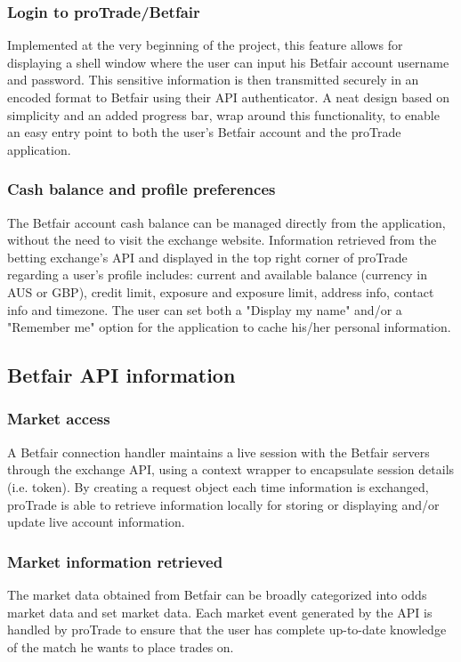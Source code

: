 \documentclass[10pt]{report}
\begin{document}
\subsubsection {Login to proTrade/Betfair}
Implemented at the very beginning of the project, this feature allows for displaying a shell window where the user can input his Betfair account username and password. This sensitive information is then transmitted securely in an encoded format to Betfair using their API authenticator. A neat design based on simplicity and an added progress bar, wrap around this functionality, to enable an easy entry point to both the user's Betfair account and the proTrade application.
\subsubsection {Cash balance and profile preferences}
The Betfair account cash balance can be managed directly from the application, without the need to visit the exchange website. Information retrieved from the betting exchange's API and displayed in the top right corner of proTrade regarding a user's profile includes: current and available balance (currency in AUS or GBP), credit limit, exposure and exposure limit, address info, contact info and timezone. The user can set both a "Display my name" and/or a "Remember me" option for the application to cache his/her personal information.

\subsection {Betfair API information}
\subsubsection {Market access}
A Betfair connection handler maintains a live session with the Betfair servers through the exchange API, using a context wrapper to encapsulate session details (i.e. token). By creating a request object each time information is exchanged, proTrade is able to retrieve information locally for storing or displaying and/or update live account information.
\subsubsection {Market information retrieved}
The market data obtained from Betfair can be broadly categorized into odds market data and set market data. Each market event generated by the API is handled by proTrade to ensure that the user has complete up-to-date knowledge of the match he wants to place trades on. 
\end{document}
